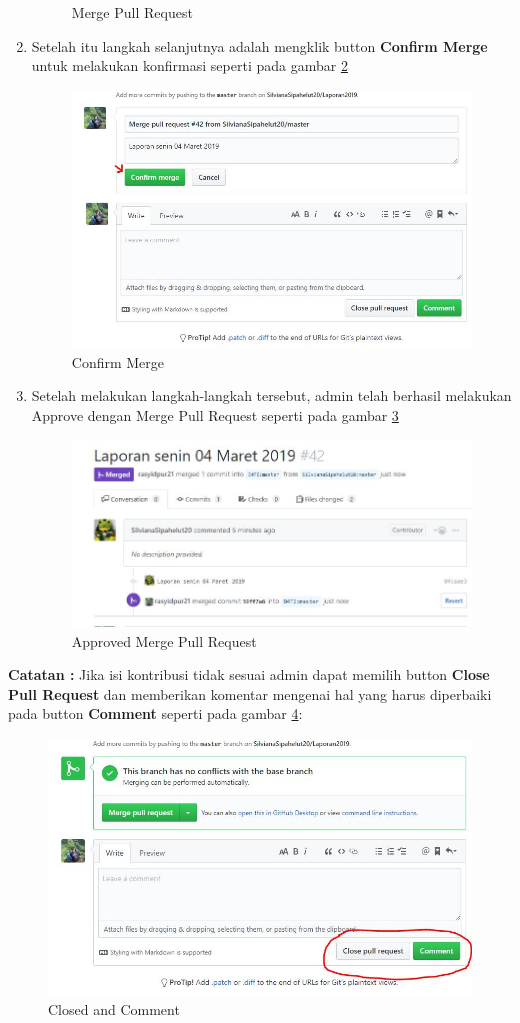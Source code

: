 \begin{enumerate}
\begin{figure}[!htbp]
\caption{Merge Pull Request}
\label{fig:mergepull}
\end{figure}
\item Setelah itu langkah selanjutnya adalah mengklik button \textbf{Confirm Merge} untuk melakukan konfirmasi seperti pada gambar \ref{fig:confirm}
\subitem
\begin{figure}[!htbp]
\centerline{\includegraphics[width=.75\textwidth]{Figures/membacapr/mr5.JPG}}
\caption{Confirm Merge}
\label{fig:confirm}
\end{figure}
\item Setelah melakukan langkah-langkah tersebut, admin telah berhasil melakukan Approve dengan Merge Pull Request seperti pada gambar \ref{fig:approvepull}
\subitem
\begin{figure}[!htbp]
\centerline{\includegraphics[width=.75\textwidth]{Figures/membacapr/mr6.JPG}}
\caption{Approved Merge Pull Request}
\label{fig:approvepull}
\end{figure}
\end{enumerate}
 \textbf{Catatan :} Jika isi kontribusi tidak sesuai admin dapat memilih button \textbf{Close Pull Request} dan memberikan komentar mengenai hal yang harus diperbaiki pada button \textbf{Comment} seperti pada gambar \ref{fig:closed}:
\subitem
\begin{figure}[!htbp]
\centerline{\includegraphics[width=.75\textwidth]{Figures/membacapr/mr4.JPG}}
\caption{Closed and Comment}
\label{fig:closed}
\end{figure}